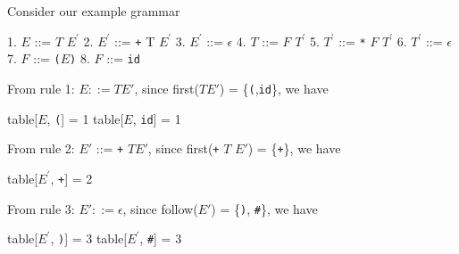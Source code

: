 \documentclass[8pt,a4paper,compress]{beamer}
\newcommand{\mm}[1]{$#1$}
\newcommand{\expo}[2]{$#1^{#2}$}
\newenvironment{spaced}
{
\smallskip
\hspace{.5cm}
\begin{minipage}[c]{\textwidth}
}
{
\end{minipage}
\smallskip
}
\begin{document}
\begin{frame}[fragile]
\pause

Consider our example grammar

\text{ }
\begin{spaced}
\begin{production}
1. \mm{E}  ::= \mm{T} \expo{E}{\prime}
2. \expo{E}{\prime} ::= \lstinline{+} T \expo{E}{\prime}
3. \expo{E}{\prime} ::= \mm{\epsilon}
4. \mm{T}  ::= \mm{F} \expo{T}{\prime}
5. \expo{T}{\prime} ::= \lstinline{*} \mm{F} \expo{T}{\prime}
6. \expo{T}{\prime} ::= \mm{\epsilon}
7. \mm{F}  ::= \lstinline{(}\mm{E}\lstinline{)}
8. \mm{F}  ::= \lstinline{id}
\end{production}
\end{spaced}

\pause
\bigskip

From rule 1: $E  ::= T E'$, since first($T E'$) = \{\lstinline{(},\lstinline{id}\}, we have

\text{ }
\begin{spaced}
\begin{production}
table[\mm{E}, \lstinline{(}] = 1
table[\mm{E}, \lstinline{id}] = 1
\end{production}
\end{spaced}

\pause
\bigskip

From rule 2: $E'$ ::= \lstinline{+} $T E'$, since first(\lstinline{+} $T$ $E'$) = \{\lstinline{+}\}, we have

\text{ }
\begin{spaced}
\begin{production}
table[\expo{E}{\prime}, \lstinline{+}] = 2
\end{production}
\end{spaced}

\pause

From rule 3: $E' ::= \epsilon$, since follow($E'$) =  \{\lstinline{)}, \lstinline{#}\}, we have

\text{ }
\begin{spaced}
\begin{production}
table[\expo{E}{\prime}, \lstinline{)}] = 3
table[\expo{E}{\prime}, \lstinline{#}] = 3
\end{production}
\end{spaced}
\end{frame}
\end{document}

